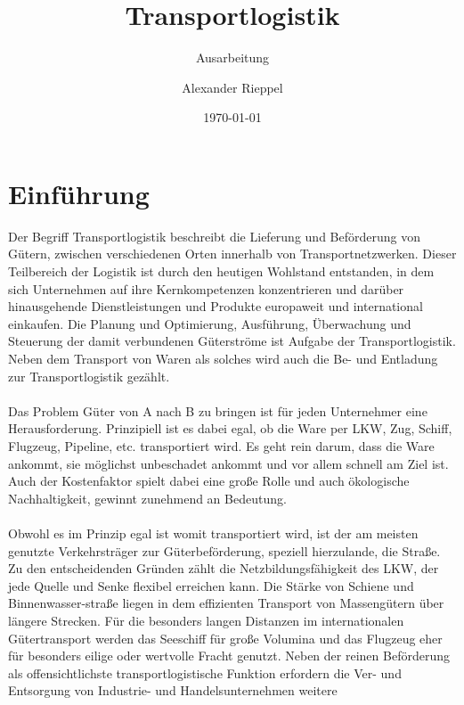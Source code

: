 \documentclass[a4paper,12pt]{scrreprt}
\begin{document}
\author{Alexander Rieppel} %
\title{Transportlogistik} %
\subject{Betriebs- und Informationsmanagement} %
\subtitle{Ausarbeitung} %
\date{\today} %
\publishers{5AHITT} %
{\Huge }

\maketitle
\tableofcontents


\chapter{Einführung}
	Der Begriff Transportlogistik beschreibt die Lieferung und Beförderung von Gütern, zwischen verschiedenen Orten innerhalb von Transportnetzwerken. Dieser Teilbereich der Logistik ist durch den heutigen Wohlstand entstanden, in dem sich Unternehmen auf ihre Kernkompetenzen konzentrieren und darüber hinausgehende Dienstleistungen und Produkte europaweit und international einkaufen. Die Planung und Optimierung, Ausführung, Überwachung und Steuerung der damit verbundenen Güterströme ist Aufgabe der Transportlogistik. 
	Neben dem Transport von Waren als solches wird auch die Be- und Entladung zur Transportlogistik gezählt. \\\\ 
	Das Problem Güter von A nach B zu bringen ist für jeden Unternehmer eine Herausforderung. Prinzipiell ist es dabei egal, ob die Ware per LKW, Zug, Schiff, Flugzeug, Pipeline, etc. transportiert wird. Es geht rein darum, dass die Ware ankommt, sie möglichst unbeschadet ankommt und vor allem schnell am Ziel ist. Auch der Kostenfaktor spielt dabei eine große Rolle und auch ökologische Nachhaltigkeit, gewinnt zunehmend an Bedeutung.\\\\
	Obwohl es im Prinzip egal ist womit transportiert wird, ist der am meisten genutzte Verkehrsträger zur Güterbeförderung, speziell hierzulande, die Straße. Zu den entscheidenden Gründen zählt die Netzbildungsfähigkeit des LKW, der jede Quelle und Senke flexibel erreichen kann. Die Stärke von Schiene und Binnenwasser-straße liegen in dem effizienten Transport von Massengütern über längere Strecken. Für die besonders langen Distanzen im internationalen Gütertransport werden das Seeschiff für große Volumina und das Flugzeug eher für besonders eilige oder wertvolle Fracht genutzt. Neben der reinen Beförderung als offensichtlichste transportlogistische Funktion erfordern die Ver- und Entsorgung von Industrie- und Handelsunternehmen weitere
\end{document}
